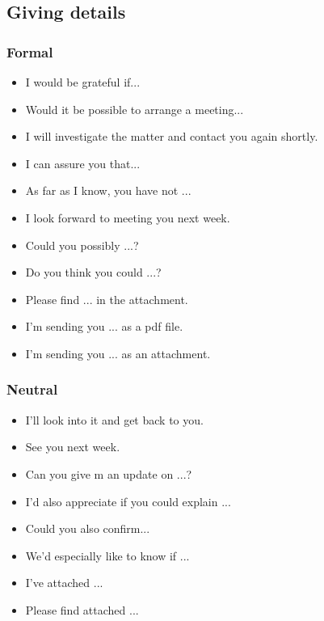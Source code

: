 \subsection{Giving details}

\subsubsection{Formal}
\begin{itemize}
\item I would be grateful if...
\item Would it be possible to arrange a meeting...
\item I will investigate the matter and contact you again shortly.
\item I can assure you that...
\item As far as I know, you have not ...
\item I look forward to meeting you next week.
\item Could you possibly ...?
\item Do you think you could ...?
\item Please find ... in the attachment.
\item I'm sending you ... as a pdf file.
\item I'm sending you ... as an attachment.
\end{itemize}

\subsubsection{Neutral}
\begin{itemize}
\item I'll look into it and get back to you.
\item See you next week.
\item Can you give m an update on ...?
\item I'd also appreciate if you could explain ...
\item Could you also confirm...
\item We'd especially like to know if ...
\item I've attached ...
\item Please find attached ...
\end{itemize}
